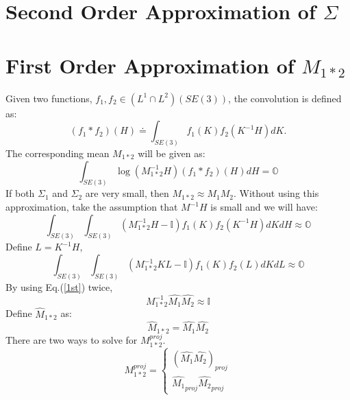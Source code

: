 \documentclass[twocolumn,10pt]{asme2ej}
\newcommand{\II}{\mathbb{I}}
\begin{document}
\section{Second Order Approximation of $\Sigma$}

\section{First Order Approximation of $M_{1*2}$}
Given two functions, $f_1, f_2 \in (L^1 \cap L^2)(SE(3))$, the convolution is defined as:
\begin{equation}
(f_1 * f_2)(H) \doteq \int_{SE(3)} f_1(K) f_2(K^{-1} H) dK. 
\label{convdef}
\end{equation}
The corresponding mean $M_{1*2}$ will be given as:
\begin{equation}
\int_{SE(3)} \log(M_{1*2}^{-1}H) (f_1*f_2)(H)dH = \mathbb{O}
\end{equation}
If both $\Sigma_1$ and $\Sigma_2$ are very small, then $M_{1*2} \approx M_1 M_2$. Without using this approximation, take the assumption that $M^{-1}H$ is small and we will have:
\begin{equation}
\int_{SE(3)}\int_{SE(3)} \left(M_{1*2}^{-1}H - \II \right)f_{1}(K)f_{2}(K^{-1}H)dKdH \approx \mathbb{O}
\end{equation}
Define $L = K^{-1}H$,
\begin{equation}
\int_{SE(3)}\int_{SE(3)} \left(M_{1*2}^{-1}KL - \II \right)f_{1}(K)f_{2}(L)dKdL \approx \mathbb{O}
\end{equation}
By using Eq.(\ref{1st}) twice,
\begin{equation}
M_{1*2}^{-1} \widehat{M_1}\widehat{M_2} \approx \II
\end{equation}
Define $\widehat{M}_{1*2}$ as:
\begin{equation}
\widehat{M}_{1*2} = \widehat{M_1}\widehat{M_2}
\end{equation}
There are two ways to solve for $M_{1*2}^{proj}$.
\begin{equation}
M_{1*2}^{proj}=
\begin{cases}
\left(\widehat{M_1}\widehat{M_2}\right)_{proj}\\
\widehat{M_{1}}_{proj}\widehat{M_{2}}_{proj}
\end{cases}
\label{b_old}
\end{equation}
\end{document}
